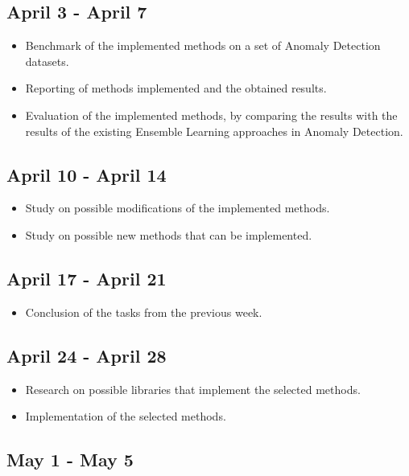 \subsection{April 3 - April 7}

\begin{itemize}
	\item Benchmark of the implemented methods on a set of Anomaly Detection datasets.
	\item Reporting of methods implemented and the obtained results.
	\item Evaluation of the implemented methods, by comparing the results with the results of the existing Ensemble Learning approaches in Anomaly Detection.
\end{itemize}

\subsection{April 10 - April 14}

\begin{itemize}
	\item Study on possible modifications of the implemented methods.
	\item Study on possible new methods that can be implemented.
\end{itemize}

\subsection{April 17 - April 21}

\begin{itemize}
	\item Conclusion of the tasks from the previous week.
\end{itemize}

\subsection{April 24 - April 28}

\begin{itemize}
	\item Research on possible libraries that implement the selected methods.
	\item Implementation of the selected methods.
\end{itemize}

\subsection{May 1 - May 5}

